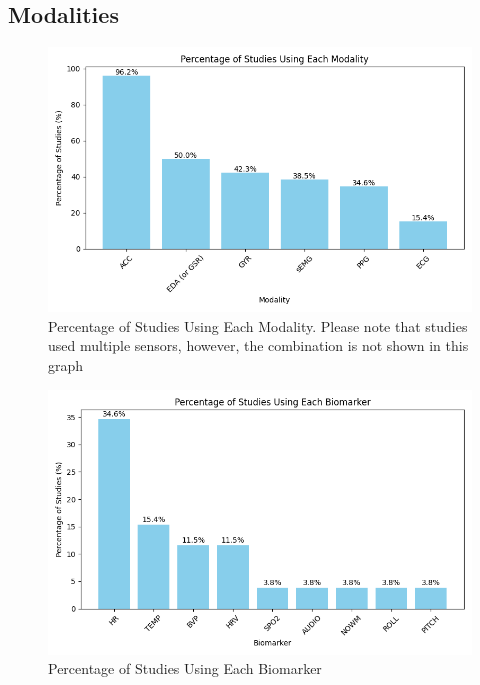 \subsection{Modalities}



\begin{figure}
    \centering
    \includegraphics[width=1\textwidth]{Results/figures/percentage_of_studies_using_each_modality.png}
    \caption{Percentage of Studies Using Each Modality. Please note that studies used multiple sensors, however, the combination is not shown in this graph}
    \label{fig:percentage_of_studies_using_each_modality}
\end{figure}

\begin{figure}
    \centering
    \includegraphics[width=1\textwidth]{Results/figures/percentage_of_studies_using_each_biomarker.png}
    \caption{Percentage of Studies Using Each Biomarker}
    \label{fig:percentage_of_studies_using_each_biomarker}
\end{figure}


